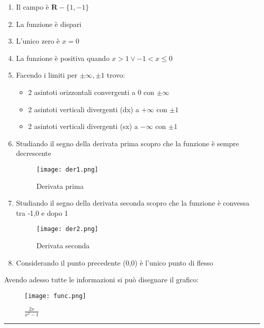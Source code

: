 \documentclass{article}
\begin{document}
\begin{enumerate}
    \item Il campo è $\mathbf{R}-\{1,-1\}$
    \item La funzione è dispari
    \item L'unico zero è $x=0$
    \item La funzione è positiva quando $x>1\vee -1<x\leq0$
    \item Facendo i limiti per $\pm\infty,\pm1$ trovo:
    \begin{itemize}
        \item 2 asintoti orizzontali convergenti a 0 con $\pm\infty$
        \item 2 asintoti verticali divergenti (dx) a $+\infty$ con $\pm1$
        \item 2 asintoti verticali divergenti (sx) a $-\infty$ con $\pm1$
    \end{itemize}

    \newpage
    
    \item Studiando il segno della derivata prima scopro che la funzione è sempre decrescente

    \begin{figure}[ht]
        \centering
        \texttt{[image: der1.png]}
        \caption{Derivata prima}
        \label{fig:der1}
    \end{figure}
    
    \item Studiando il segno della derivata seconda scopro che la funzione è convessa tra -1,0 e dopo 1

    \begin{figure}[ht]
        \centering
        \texttt{[image: der2.png]}
        \caption{Derivata seconda}
        \label{fig:der2}
    \end{figure}
    
    \item Considerando il punto precedente (0,0) è l'unico punto di flesso\newpage
\end{enumerate}

\noindent Avendo adesso tutte le informazioni si può disegnare il grafico:

    \begin{figure}[ht]
        \centering
        \texttt{[image: func.png]}
        \caption{$\frac{2x}{x^2-1}$}
        \label{fig:func}
    \end{figure}

\noindent\rule{\textwidth}{0.5pt}\newline
\end{document}
